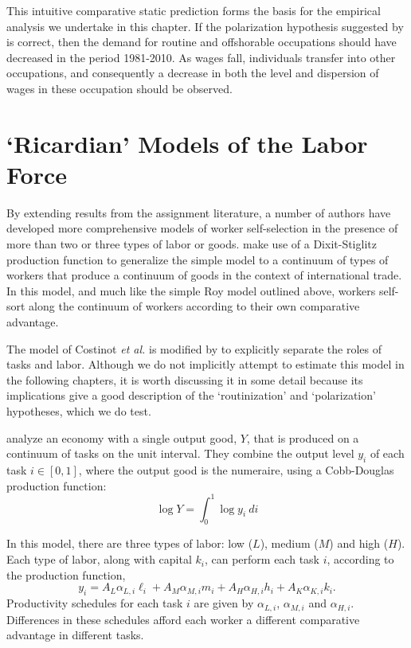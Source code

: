 This intuitive comparative static prediction forms the basis for the empirical analysis we undertake in this chapter. If the polarization hypothesis suggested by \citet{Levy2003} is correct, then the demand for routine and offshorable occupations should have decreased in the period 1981-2010. As wages fall, individuals transfer into other occupations, and consequently a decrease in both the level and dispersion of wages in these occupation should be observed.

\section{`Ricardian' Models of the Labor Force}\label{sec:ricardo}

By extending results from the assignment literature, a number of authors have developed more comprehensive models of worker self-selection in the presence of more than two or three types of labor or goods. \citet{Costinot2010} make use of a Dixit-Stiglitz production function to generalize the simple \citet{Levy2003} model to a continuum of types of workers that produce a continuum of goods in the context of international trade. In this model, and much like the simple Roy model outlined above, workers self-sort along the continuum of workers according to their own comparative advantage.

The model of Costinot {\em et al.} is modified by \citet{Acemoglu2011} to explicitly separate the roles of tasks and labor. Although we do not implicitly attempt to estimate this model in the following chapters, it is worth discussing it in some detail because its implications give a good description of the `routinization' and `polarization' hypotheses, which we do test.

\citet{Acemoglu2011} analyze an economy with a single output good, $Y$, that is produced on a continuum of tasks on the unit interval. They combine the output level $y_i$ of each task $i\in[0,1]$, where the output good is the numeraire, using a Cobb-Douglas production function:
$$
  \log Y = \int_0^1 \log y_i\ di
$$

In this model, there are three types of labor: low ($L$), medium ($M$) and high ($H$). Each type of labor, along with capital $k_i$, can perform each task $i$, according to the production function,
$$
y_i = A_L\alpha_{L,i}\ell_i + A_M\alpha_{M,i}m_i + A_H\alpha_{H,i}h_i + A_K\alpha_{K,i}k_i.
$$
Productivity schedules for each task $i$ are given by $\alpha_{L,i}$, $\alpha_{M,i}$ and $\alpha_{H,i}$. Differences in these schedules afford each worker a different comparative advantage in different tasks.

